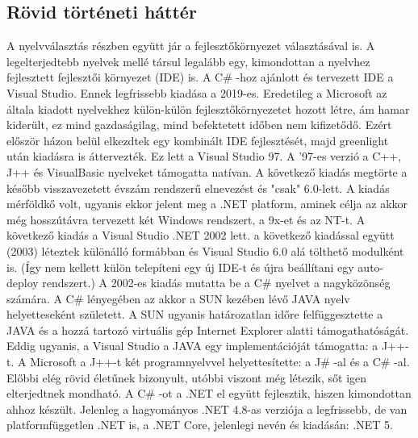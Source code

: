 \subsection{Rövid történeti háttér}
A nyelvválasztás részben együtt jár a fejlesztőkörnyezet választásával is. A legelterjedtebb nyelvek mellé társul legalább egy, kimondottan a nyelvhez fejlesztett fejlesztői környezet (IDE) is. A C\# -hoz ajánlott és tervezett  IDE a Visual Studio. Ennek legfrissebb kiadása a 2019-es. Eredetileg a Microsoft az általa kiadott nyelvekhez külön-külön fejlesztőkörnyezetet hozott létre, ám hamar kiderült, ez mind gazdaságilag, mind befektetett időben nem kifizetődő. Ezért először házon belül elkezdtek egy kombinált IDE fejlesztését, majd greenlight után kiadásra is áttervezték. Ez lett a Visual Studio 97. A '97-es verzió a C++, J++ és VisualBasic nyelveket támogatta natívan. A következő kiadás megtörte a később visszavezetett évszám rendszerű elnevezést és "csak" 6.0-lett. A kiadás mérföldkő volt, ugyanis ekkor jelent meg a .NET platform, aminek célja az akkor még hosszútávra tervezett két Windows rendszert, a 9x-et és az NT-t. A következő kiadás a Visual Studio .NET 2002 lett. a következő kiadással együtt (2003) léteztek különálló formábban és Visual Studio 6.0 alá tölthető modulként is. (Így nem kellett külön telepíteni egy új IDE-t és újra beállítani egy auto-deploy rendszert.) A 2002-es kiadás mutatta be a C\# nyelvet a nagyközönség számára. A C\# lényegében az akkor a SUN kezében lévő JAVA nyelv helyetteseként született. A SUN ugyanis határozatlan időre felfüggesztette a JAVA és a hozzá tartozó virtuális gép Internet Explorer alatti támogathatóságát. Eddig ugyanis, a Visual Studio a JAVA egy implementációját támogatta: a J++-t. A Microsoft a J++-t két programnyelvvel helyettesítette: a J\# -al és a C\# -al. Előbbi elég rövid életűnek bizonyult, utóbbi viszont még létezik, sőt igen elterjedtnek mondható. A C\# -ot a .NET el együtt fejlesztik, hiszen kimondottan ahhoz készült. 
Jelenleg a hagyományos .NET 4.8-as verziója a legfrissebb, de van platformfüggetlen .NET is, a .NET Core, jelenlegi nevén és kiadásán: .NET 5.

